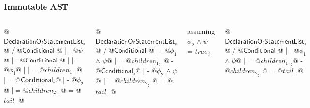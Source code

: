 \documentclass{beamer}
\newcommand{\id}[1]{\ensuremath{#1}}
\newcommand{\pc}  [1]{\ensuremath{{\id{#1}}_\phi}}
\newcommand{\node}[1]{\ensuremath{{\id{#1}}_\circ}}
\newcommand{\name}[1]{\textsf{#1}}
\newcommand{\lst} [1]{\ensuremath{{\id{#1}}_{::}}}
\begin{document}
\begin{frame}[fragile]
\frametitle{Immutable AST}

	\begin{columns}
	
	\begin{vastcode}
@\node{\name{DeclarationOrStatementList}}@
/ @\node{\name{Conditional}}@
| - @\id{\psi}@
| - @\node{\name{Conditional}}@
| | - @\id{\phi_1}@
| | = @\lst{\id{children_1}}@
| = @\node{\name{Conditional}}@
|   - @\id{\phi_2}@
|   = @\lst{\id{children_2}}@
= @\lst{\id{tail}}@
	\end{vastcode}
	
	\begin{vastcode}
@\color{blue}\node{\name{DeclarationOrStatementList}}@
/ @\color{blue}\node{\name{Conditional}}@
| - @\color{blue}\id{\phi_1} $\land$ \id{\psi}@
| = @\lst{\id{children_1}}@
- @\color{blue}\node{\name{Conditional}}@
| - @\color{blue}\id{\phi_2} $\land$ \id{\psi}@
| = @\lst{\id{children_2}}@
= @\lst{\id{tail}}@
	\end{vastcode}
	
	\column{0.33\textwidth}
	assuming \\
	\id{\phi_2} $\land$ \id{\psi} = \pc{true}
	\begin{vastcode}
@\color{red}\node{\name{DeclarationOrStatementList}}@
/ @\color{blue}\node{\name{Conditional}}@
| - @\color{blue}\id{\phi_1} $\land$ \id{\psi}@
| = @\lst{\id{children_1}}@
- @\lst{\id{children_2}}@
= @\lst{\id{tail}}@
	\end{vastcode}
	
	\end{columns}
\end{frame}
\end{document}
